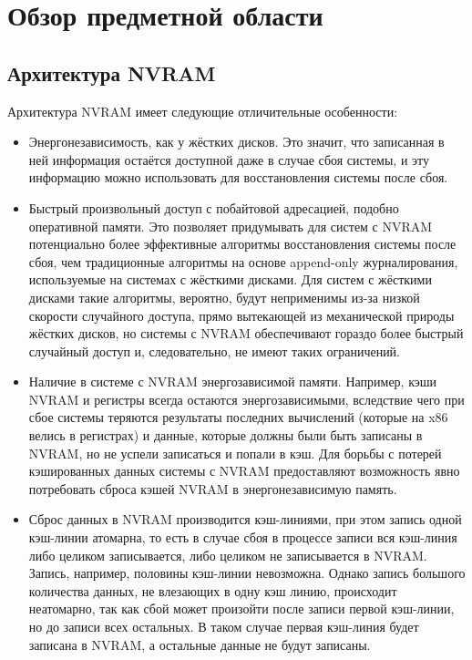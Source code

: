 \documentclass[times,specification,annotation]{itmo-student-thesis}
\begin{document}
\chapter{Обзор предметной области}

\section{Архитектура NVRAM}

Архитектура NVRAM имеет следующие отличительные особенности:

\begin{itemize}
    \item Энергонезависимость, как у жёстких дисков. Это значит, что записанная в ней информация остаётся доступной даже в случае сбоя системы, и эту информацию можно использовать для восстановления системы после сбоя.
    
    \item Быстрый произвольный доступ с побайтовой адресацией, подобно оперативной памяти. Это позволяет придумывать для систем с NVRAM потенциально более эффективные алгоритмы восстановления системы после сбоя, чем традиционные алгоритмы на основе append-only журналирования, используемые на системах с жёсткими дисками. Для систем с жёсткими дисками такие алгоритмы, вероятно, будут неприменимы из-за низкой скорости случайного доступа, прямо вытекающей из механической природы жёстких дисков, но системы с NVRAM обеспечивают гораздо более быстрый случайный доступ и, следовательно, не имеют таких ограничений.
    
    \item Наличие в системе с NVRAM энергозависимой памяти. Например, кэши NVRAM и регистры всегда остаются энергозависимыми, вследствие чего при сбое системы теряются результаты последних вычислений (которые на x86 велись в регистрах) и данные, которые должны были быть записаны в NVRAM, но не успели записаться и попали в кэш. Для борьбы с потерей кэшированных данных системы с NVRAM предоставляют возможность явно потребовать сброса кэшей NVRAM в энергонезависимую память.
    
    \item Сброс данных в NVRAM производится кэш-линиями, при этом запись одной кэш-линии атомарна, то есть в случае сбоя в процессе записи вся кэш-линия либо целиком записывается, либо целиком не записывается в NVRAM. Запись, например, половины кэш-линии невозможна. Однако  запись большого количества данных, не влезающих в одну кэш линию, происходит неатомарно, так как сбой может произойти после записи первой кэш-линии, но до записи всех остальных. В таком случае первая кэш-линия будет записана в NVRAM, а остальные данные не будут записаны.
\end{itemize}
\end{document}
